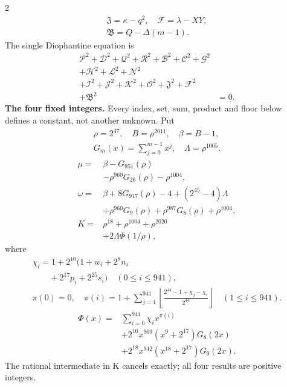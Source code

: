 \documentclass[10pt]{article}
\newcommand{\fl}[1]{\left\lfloor#1\right\rfloor}
\begin{document}
\begin{multicols}{2}
\[\begin{gathered}
\mathfrak{J}=\kappa-q^2,\quad\mathcal{F}=\lambda-XY,\\
\mathfrak{B}=Q-\Delta(m-1).
\end{gathered}
\]
The single Diophantine equation is
\[
\begin{split}
\mathcal{P}^2+\mathcal{D}^2+\mathcal{Q}^2+\mathcal{R}^2+\mathcal{B}^2+\mathcal{C}^2+\mathcal{G}^2 &\\
+\mathcal{H}^2+\mathcal{L}^2+\mathcal{N}^2 &\\
+\mathcal{I}^2+\mathcal{J}^2+\mathcal{K}^2+\mathcal{O}^2+\mathfrak{J}^2+\mathcal{F}^2 &\\
+\mathfrak{B}^2 &= 0.
\end{split}
\]
\textbf{The four fixed integers.}
Every index, set, sum, product and floor below defines a constant, not
another unknown. Put
\[
\begin{gathered}
\rho=2^{47},\quad B=\rho^{2011},\quad\beta=B-1,\\
G_m(x)=\sum_{j=0}^{m-1}x^j,\quad
\Lambda=\rho^{1005}.
\end{gathered}
\]
\begin{align*}
\mu={}&\beta-G_{951}(\rho)\\
&-\rho^{960}G_{26}(\rho)-\rho^{1004},\\
\omega={}&\beta+8G_{917}(\rho)-4+(2^{45}-4)\Lambda\\
&+\rho^{960}G_9(\rho)+\rho^{987}G_8(\rho)
  +\rho^{1004},\\
K={}&\rho^{18}+\rho^{1004}+\rho^{2020}\\
&+2\Lambda\Phi(1/\rho),
\end{align*}
where
\[
\begin{gathered}
\chi_i=1+2^{10}(1+w_i+2^8n_i\\
\qquad+2^{17}p_i+2^{25}s_i)\quad(0\le i\le941),\\
\pi(0)=0,\quad\pi(i)=1+\sum_{j=1}^{941}
\fl{\frac{2^{44}-1+\chi_j-\chi_i}{2^{44}}}\quad(1\le i\le941).
\end{gathered}
\]
\[
\begin{split}
\Phi(x)={}&\sum_{i=0}^{941}\chi_i x^{\pi(i)}\\
&+2^{10}x^{969}(x^9+2^{17})G_8(2x)\\
&+2^{18}x^{942}(x^{18}+2^{17})G_9(2x).
\end{split}
\]
The rational intermediate in K cancels exactly; all four results are positive integers.


\end{multicols}
\end{document}
